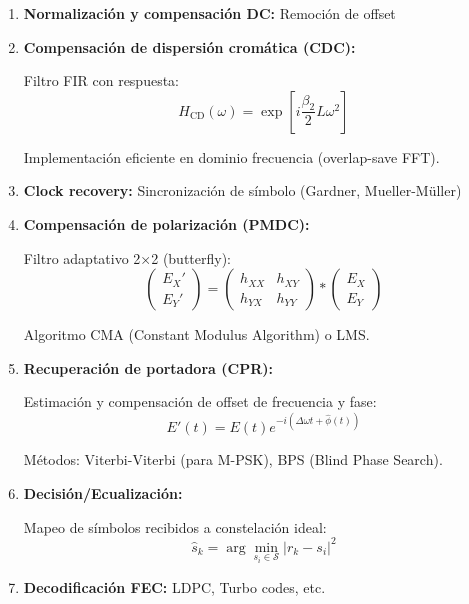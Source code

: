 \documentclass[11pt,a4paper]{article}
\begin{document}
\begin{enumerate}
    \item \textbf{Normalización y compensación DC:} Remoción de offset
    
    \item \textbf{Compensación de dispersión cromática (CDC):}
    
    Filtro FIR con respuesta:
    \begin{equation}
        H_{\text{CD}}(\omega) = \exp\left[i\frac{\beta_2}{2}L\omega^2\right]
    \end{equation}
    
    Implementación eficiente en dominio frecuencia (overlap-save FFT).
    
    \item \textbf{Clock recovery:} Sincronización de símbolo (Gardner, Mueller-Müller)
    
    \item \textbf{Compensación de polarización (PMDC):}
    
    Filtro adaptativo 2×2 (butterfly):
    \begin{equation}
        \begin{pmatrix} E_X' \\ E_Y' \end{pmatrix} = \begin{pmatrix} h_{XX} & h_{XY} \\ h_{YX} & h_{YY} \end{pmatrix} * \begin{pmatrix} E_X \\ E_Y \end{pmatrix}
    \end{equation}
    
    Algoritmo CMA (Constant Modulus Algorithm) o LMS.
    
    \item \textbf{Recuperación de portadora (CPR):}
    
    Estimación y compensación de offset de frecuencia y fase:
    \begin{equation}
        E'(t) = E(t)e^{-i(\Delta\omega t + \hat{\phi}(t))}
    \end{equation}
    
    Métodos: Viterbi-Viterbi (para M-PSK), BPS (Blind Phase Search).
    
    \item \textbf{Decisión/Ecualización:}
    
    Mapeo de símbolos recibidos a constelación ideal:
    \begin{equation}
        \hat{s}_k = \arg\min_{s_i \in \mathcal{S}} |r_k - s_i|^2
    \end{equation}
    
    \item \textbf{Decodificación FEC:} LDPC, Turbo codes, etc.
\end{enumerate}
\end{document}
